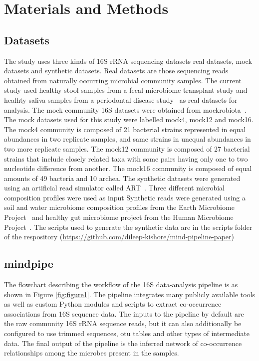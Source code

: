 
\section*{Materials and Methods}

  \subsection*{Datasets}

  \vspace{-5mm}
  The study uses three kinds of 16S rRNA sequencing datasets \- real datasets, mock datasets and synthetic datasets.
  Real datasets are those sequencing reads obtained from naturally occurring microbial community samples.
  The current study used healthy stool samples from a fecal microbiome transplant study \cite{Kang2017} and healhty saliva samples from a periodontal disease study~\cite{Chen2018} as real datasets for analysis.
  The mock community 16S datasets were obtained from mockrobiota~\cite{Bokulich2016}.
  The mock datasets used for this study were labelled mock4, mock12 and mock16.
  The mock4 community is composed of 21 bacterial strains represented in equal abundances in two replicate samples, and same strains in unequal abundances in two more replicate samples.
  The mock12 community is composed of 27 bacterial strains that include closely related taxa with some pairs having only one to two nucleotide difference from another.
  The mock16 community is composed of equal amounts of 49 bacteria and 10 archea.
  The synthetic datasets were generated using an artificial read simulator called ART~\cite{Huang2012}.
  Three different microbial composition profiles were used as input
  Synthetic reads were generated using a soil and water microbiome composition profiles from the Earth Microbiome Project~\cite{Thompson2017} and healthy gut microbiome project from the Human Microbiome Project~\cite{HumanMicrobiomeProjectConsortium2012}.
  The scripts used to generate the synthetic data are in the scripts folder of the respository (\href{https://github.com/dileep-kishore/mind-pipeline-paper}{https://github.com/dileep-kishore/mind-pipeline-paper})

  \subsection*{mindpipe}

  \vspace{-5mm}
  The flowchart describing the workflow of the 16S data-analysis pipeline is as shown in Figure \ref{fig:figure1}.
  The pipeline integrates many publicly available tools as well as custom Python modules and scripts to extract co-occurrence associations from 16S sequence data.
  The inputs to the pipeline by default are the raw community 16S rRNA sequence reads, but it can also additionally be configured to use trimmed sequences, \ac{otu} tables and other types of intermediate data.
  The final output of the pipeline is the inferred network of co-occurrence relationships among the microbes present in the samples.

